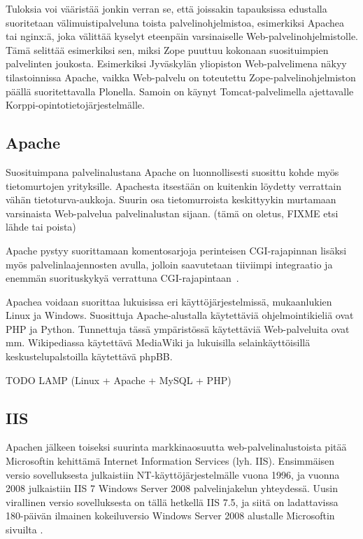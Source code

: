 Tuloksia voi vääristää jonkin verran se, että joissakin tapauksissa
edustalla suoritetaan välimuistipalveluna toista palvelinohjelmistoa,
esimerkiksi Apachea tai nginx:ä, joka välittää kyselyt eteenpäin
varsinaiselle Web-palvelinohjelmistolle. Tämä selittää esimerkiksi
sen, miksi Zope puuttuu kokonaan suosituimpien palvelinten
joukosta. Esimerkiksi Jyväskylän yliopiston Web-palvelimena näkyy
tilastoinnissa Apache, vaikka Web-palvelu on toteutettu
Zope-palvelinohjelmiston päällä suoritettavalla Plonella. Samoin on
käynyt Tomcat-palvelimella ajettavalle Korppi-o\-pin\-to\-tie\-to\-jär\-jes\-tel\-mäl\-le.

\subsection{Apache}

Suosituimpana palvelinalustana Apache on luonnollisesti suosittu kohde
myös tietomurtojen yrityksille. Apachesta itsestään on kuitenkin
löydetty verrattain vähän
tietoturva-aukkoja. Suurin osa tietomurroista
keskittyykin murtamaan varsinaista Web-palvelua palvelinalustan
sijaan. (tämä on oletus, FIXME etsi lähde tai poista)

Apache pystyy suorittamaan komentosarjoja perinteisen CGI-rajapinnan
lisäksi myös palvelinlaajennosten avulla, jolloin saavutetaan
tiiviimpi integraatio ja enemmän suorituskykyä verrattuna
CGI-rajapintaan~\cite{cginopeus}.

Apachea voidaan suorittaa lukuisissa eri käyttöjärjestelmissä,
mukaanlukien Linux ja Windows. Suosittuja Apache-alustalla
käytettäviä ohjelmointikieliä ovat PHP ja Python. Tunnettuja tässä
ympäristössä käytettäviä Web-palveluita ovat mm. Wikipediassa
käytettävä MediaWiki ja lukuisilla selainkäyttöisillä
keskustelupalstoilla käytettävä phpBB.

TODO LAMP (Linux + Apache + MySQL + PHP)


\subsection{IIS}

Apachen jälkeen toiseksi suurinta markkinaosuutta web-palvelinalustoista pitää Microsoftin kehittämä Internet Information Services (lyh. IIS). Ensimmäisen versio sovelluksesta
julkaistiin NT-käyttöjärjestelmälle vuona 1996, ja vuonna 2008 julkaistiin IIS 7 Windows Server 2008 palvelinjakelun yhteydessä. Uusin virallinen versio sovelluksesta on tällä hetkellä   
IIS 7.5, ja siitä on ladattavissa 180-päivän ilmainen kokeiluversio Windows Server 2008 alustalle Microsoftin sivuilta \cite{IIS}.

